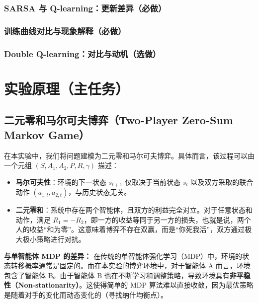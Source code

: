 \documentclass{article}
\begin{document}
\subsubsection{SARSA 与 Q-learning：更新差异（必做）}

\subsubsection{训练曲线对比与现象解释（必做）}

\subsubsection{Double Q-learning：对比与动机（选做）}

\section{实验原理（主任务）}

\subsection{二元零和马尔可夫博弈（Two-Player Zero-Sum Markov Game）}
在本实验中，我们将问题建模为二元零和马尔可夫博弈。具体而言，该过程可以由一个元组 $(S, A_1, A_2, P, R, \gamma)$ 描述：
\begin{itemize}
    \item \textbf{马尔可夫性}：环境的下一状态 $s_{t+1}$ 仅取决于当前状态 $s_t$ 以及双方采取的联合动作 $(a_{1,t}, a_{2,t})$，与历史状态无关。
    \item \textbf{二元零和}：系统中存在两个智能体，且双方的利益完全对立。对于任意状态和动作，满足 $R_1 = -R_2$，即一方的收益等同于另一方的损失，也就是说，两个人的收益“和为零”。这意味着博弈不存在双赢，而是“你死我活”，双方通过极大极小策略进行对抗。
\end{itemize}

\textbf{与单智能体 MDP 的差异：}
在传统的单智能体强化学习（MDP）中，环境的状态转移概率通常是固定的。而在本实验的博弈环境中，对于智能体 A 而言，环境包含了智能体 B。由于智能体 B 也在不断学习和调整策略，导致环境具有\textbf{非平稳性（Non-stationarity）}。这使得简单的 MDP 算法难以直接收敛，因为最优策略是随着对手的变化而动态变化的（寻找纳什均衡点）。
\end{document}
